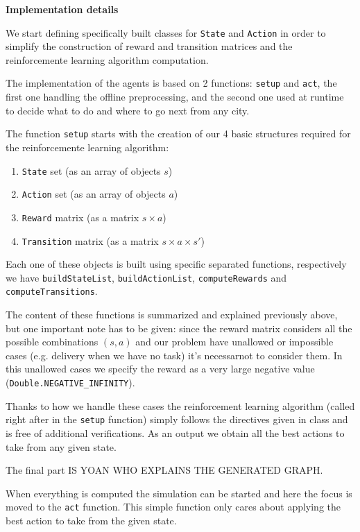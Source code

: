 \documentclass[11pt,a4paper]{article}
\begin{document}
\bigskip
\textbf{Implementation details}

We start defining specifically built classes for \texttt{State} and
\texttt{Action} in order to simplify the construction of reward and transition
matrices and the reinforcemente learning algorithm computation.

The implementation of the agents is based on 2 functions: \texttt{setup} and
\texttt{act}, the first one handling the offline preprocessing, and the second
one used at runtime to decide what to do and where to go next from any city.

The function \texttt{setup} starts with the creation of our 4 basic structures
required for the reinforcemente learning algorithm:

\begin{enumerate}
    \item{\texttt{State} set (as an array of objects $s$)}
    \item{\texttt{Action} set (as an array of objects $a$)}
    \item{\texttt{Reward} matrix (as a matrix $s \times a$)}
    \item{\texttt{Transition} matrix (as a matrix $s \times a \times s'$)}
\end{enumerate}

Each one of these objects is built using specific separated functions,
respectively we have \texttt{buildStateList}, \texttt{buildActionList},
\texttt{computeRewards} and \texttt{computeTransitions}.

The content of these functions is summarized and explained previously above,
but one important note has to be given: since the reward matrix considers
all the possible combinations $(s, a)$ and our problem have unallowed or
impossible cases (e.g. delivery when we have no task) it's necessarnot to
consider them. In this unallowed cases we specify the reward as a very large
negative value (\texttt{Double.NEGATIVE\_INFINITY}).

Thanks to how we handle these cases the reinforcement learning algorithm
(called right after in the \texttt{setup} function) simply follows the
directives given in class and is free of additional verifications. As an output
we obtain all the best actions to take from any given state.

The final part IS YOAN WHO EXPLAINS THE GENERATED GRAPH.\newline

When everything is computed the simulation can be started and here the focus is
moved to the \texttt{act} function. This simple function only cares about
applying the best action to take from the given state.
\end{document}
